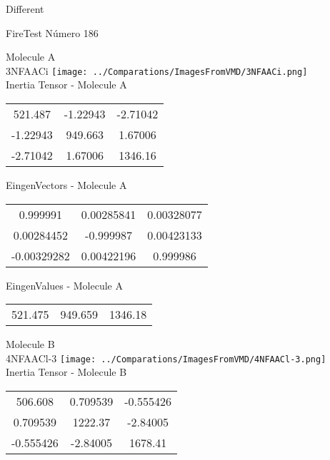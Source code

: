 \begin{center}
\vtab
\vtab
\textcolor{NavyBlue}{\Large Different}
\end{center}

 \newpage

\vtab[-2cm]
\begin{center}
{\large FireTest \tab Número 186}
\end{center}
\begin{multicols}{2}
\begin{center}

Molecule A \\ 
3NFAACi
\texttt{[image: ../Comparations/ImagesFromVMD/3NFAACi.png]}
\\
Inertia Tensor - Molecule A \\
\vtab

\begin{tabular}{|c c c|}
521.487	 & 	-1.22943	 & 	-2.71042	 \\
-1.22943	 & 	949.663	 & 	1.67006	 \\
-2.71042	 & 	1.67006	 & 	1346.16
\end{tabular}

\vtab
 EingenVectors - Molecule A     \\
\vtab
\begin{tabular}{|c c c|}
0.999991	 & 	0.00285841	 & 	0.00328077	 \\
0.00284452	 & 	-0.999987	 & 	0.00423133	 \\
-0.00329282	 & 	0.00422196	 & 	0.999986
\end{tabular}

\vtab
 EingenValues - Molecule A     \\
\vtab
\begin{tabular}{|c c c|}
521.475	 & 	949.659	 & 	1346.18	 \\
\end{tabular}
\columnbreak

Molecule B \\ 
4NFAACl-3
\texttt{[image: ../Comparations/ImagesFromVMD/4NFAACl-3.png]}
\\
Inertia Tensor - Molecule B \\
\vtab

\begin{tabular}{|c c c|}
506.608	 & 	0.709539	 & 	-0.555426	 \\
0.709539	 & 	1222.37	 & 	-2.84005	 \\
-0.555426	 & 	-2.84005	 & 	1678.41
\end{tabular}


\end{center}
\end{multicols}
